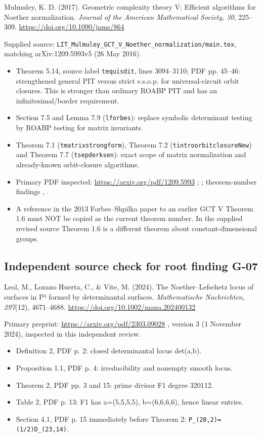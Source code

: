 \documentclass[11pt,a4paper]{article}
\providecommand{\tightlist}{\setlength{\itemsep}{0pt}\setlength{\parskip}{0pt}}
\theoremstyle{definition}\newtheorem{definition}{Definition}
\begin{document}
Mulmuley, K. D. (2017). Geometric complexity theory V: Efficient
algorithms for Noether normalization. \emph{Journal of the American
Mathematical Society, 30}, 225--309.
\url{https://doi.org/10.1090/jams/864}

Supplied source:
\nolinkurl{LIT_Mulmuley_GCT_V_Noether_normalization/main.tex},
matching arXiv:1209.5993v5 (26 May 2016).

\begin{itemize}
\tightlist
\item
  Theorem 5.14, source label \nolinkurl{tequisdit}, lines 3094--3110; PDF
  pp. 45--46: strengthened general PIT versus strict e.s.o.p. for
  universal-circuit orbit closures. This is stronger than ordinary ROABP
  PIT and has an infinitesimal/border requirement.
\item
  Section 7.5 and Lemma 7.9 (\nolinkurl{lforbes}): replace symbolic
  determinant testing by ROABP testing for matrix invariants.
\item
  Theorem 7.1 (\nolinkurl{tmatrixstrongform}), Theorem 7.2
  (\nolinkurl{tintroorbitclosureNew}) and Theorem 7.7
  (\nolinkurl{tsepderksen}): exact scope of matrix normalization and
  already-known orbit-closure algorithms.
\item
  Primary PDF inspected: \url{https://arxiv.org/pdf/1209.5993} ; ;
  theorem-number findings , .
\item
  A reference in the 2013 Forbes--Shpilka paper to an earlier GCT V
  Theorem 1.6 must NOT be copied as the current theorem number. In the
  supplied revised source Theorem 1.6 is a different theorem about
  constant-dimensional groups.
\end{itemize}

\subsection{Independent source check for root finding
G-07}\label{independent-source-check-for-root-finding-g-07}

Leal, M., Lozano Huerta, C., \& Vite, M. (2024). The Noether--Lefschetz
locus of surfaces in P³ formed by determinantal surfaces.
\emph{Mathematische Nachrichten, 297}(12), 4671--4688.
\url{https://doi.org/10.1002/mana.202400132}

Primary preprint: \url{https://arxiv.org/pdf/2303.09028} , version 3 (1
November 2024), inspected in this independent review.

\begin{itemize}
\tightlist
\item
  Definition 2, PDF p. 2: closed determinantal locus det(a,b).
\item
  Proposition 1.1, PDF p. 4: irreducibility and nonempty smooth locus.
\item
  Theorem 2, PDF pp. 3 and 15: prime divisor F1 degree 320112.
\item
  Table 2, PDF p. 13: F1 has a=(5,5,5,5), b=(6,6,6,6), hence linear
  entries.
\item
  Section 4.1, PDF p. 15 immediately before Theorem 2:
  \nolinkurl{P_(20,2)=(1/2)D_(23,14)}.
\end{itemize}
\end{document}
